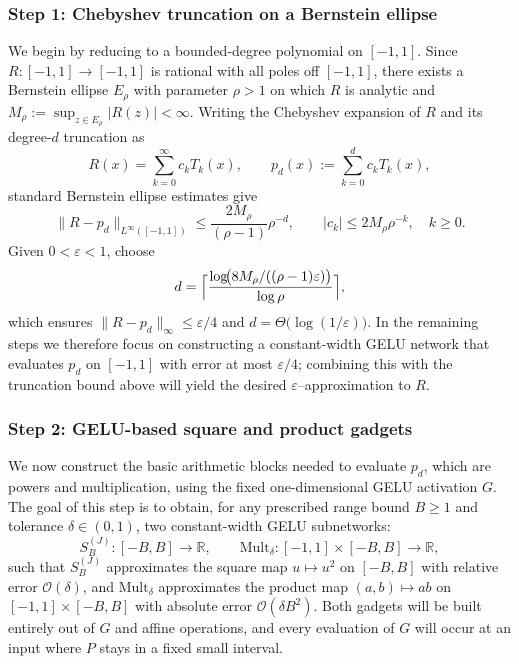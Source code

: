 \documentclass{article}
\theoremstyle{plain}
\theoremstyle{definition}
\theoremstyle{remark}
\begin{document}
\subsubsection*{Step 1: Chebyshev truncation on a Bernstein ellipse}

We begin by reducing to a bounded-degree polynomial on $[-1,1]$. Since $R:[-1,1]\to[-1,1]$ is rational with all poles off $[-1,1]$, there exists a Bernstein ellipse $E_\rho$ with parameter $\rho>1$ on which $R$ is analytic and \(
M_\rho:=\sup_{z\in E_\rho}|R(z)|<\infty.
\) Writing the Chebyshev expansion of $R$ and its degree-$d$ truncation as
\[
R(x)=\sum_{k=0}^\infty c_k T_k(x),
\qquad
p_d(x):=\sum_{k=0}^d c_k T_k(x),
\]
standard Bernstein ellipse estimates give~\cite{trefethen2019approximation}
\[
\|R-p_d\|_{L^\infty([-1,1])}
\le
\frac{2M_\rho}{(\rho-1)}\rho^{-d},
\qquad
|c_k|\le 2M_\rho\rho^{-k},\quad k\ge 0.
\]
Given $0<\varepsilon<1$, choose
\[
d
=
\Bigl\lceil
\frac{\log\!\bigl(8M_\rho/((\rho-1)\varepsilon)\bigr)}{\log\rho}
\Bigr\rceil,
\]
which ensures $\|R-p_d\|_\infty\le \varepsilon/4$ and $d=\Theta\bigl(\log(1/\varepsilon)\bigr)$. In the remaining steps we therefore focus on constructing a constant-width GELU network that evaluates $p_d$ on $[-1,1]$ with error at most $\varepsilon/4$; combining this with the truncation bound above will yield the desired $\varepsilon$–approximation to $R$.

\subsubsection*{Step 2: GELU-based square and product gadgets}

We now construct the basic arithmetic blocks needed to evaluate $p_d$, which are powers and multiplication, using the fixed one-dimensional GELU activation $G$. The goal of this step is to obtain, for any prescribed range bound $B\ge 1$ and tolerance $\delta\in(0,1)$, two constant-width GELU subnetworks:
\[
S_B^{(J)}:[-B,B]\to\mathbb{R},
\qquad
\mathrm{Mult}_\delta:[-1,1]\times[-B,B]\to\mathbb{R},
\]
such that $S_B^{(J)}$ approximates the square map $u\mapsto u^2$ on $[-B,B]$ with relative error $\mathcal{O}(\delta)$, and $\mathrm{Mult}_\delta$ approximates the product map $(a,b)\mapsto ab$ on $[-1,1]\times[-B,B]$ with absolute error $\mathcal{O}(\delta B^2)$. Both gadgets will be built entirely out of $G$ and affine operations, and every evaluation of $G$ will occur at an input where $P$ stays in a fixed small interval. 
\end{document}

